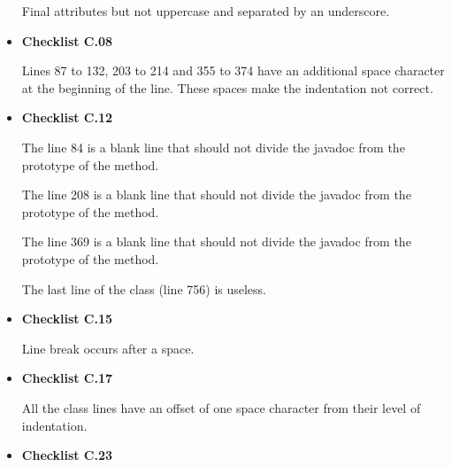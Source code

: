 \documentclass[../../../../codeInspection.tex]{subfiles}
\begin{document}
\begin{itemize}
		    	  

		    	  Final attributes but not uppercase and separated by an underscore.

		    \item \textbf{Checklist C.08}

		    	  Lines 87 to 132, 203 to 214 and 355 to 374 have an additional space character at the beginning of the line. These spaces make the indentation not correct.

		    \item \textbf{Checklist C.12}

		    	  

		    	  The line 84 is a blank line that should not divide the javadoc from the prototype of the method.

		    	  

		    	  The line 208 is a blank line that should not divide the javadoc from the prototype of the method.

		    	  

		    	  The line 369 is a blank line that should not divide the javadoc from the prototype of the method.

		    	  The last line of the class (line 756) is useless.

		    \item \textbf{Checklist C.15}

		    	  

		    	  Line break occurs after a space.

		    \item \textbf{Checklist C.17}

		    	  All the class lines have an offset of one space character from their level of indentation.

		    \item \textbf{Checklist C.23}

		    	  


\end{itemize}
\end{document}
